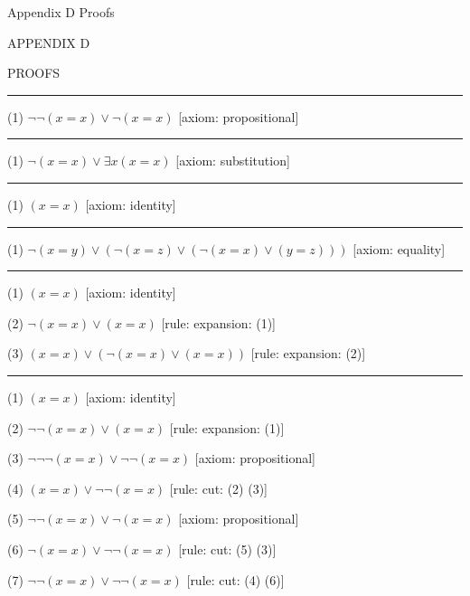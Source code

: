  {Appendix D Proofs}
\centerline{\xmplbxi APPENDIX D}
\medskip
\centerline{\xmplbx PROOFS}
\bigskip

\medskip
\hrule
\medskip
\item{(1)} $\neg \neg (x = x) \lor \neg (x = x)$ \hfill [axiom: propositional]
\medskip
\hrule
\medskip
\item{(1)} $\neg (x = x) \lor \exists x (x = x)$ \hfill [axiom: substitution]
\medskip
\hrule
\medskip
\item{(1)} $(x = x)$ \hfill [axiom: identity]
\medskip
\hrule
\medskip
\item{(1)} $\neg (x = y) \lor (\neg (x = z) \lor (\neg (x = x) \lor (y = z)))$ \hfill [axiom: equality]
\medskip
\hrule
\medskip
\item{(1)} $(x = x)$ \hfill [axiom: identity]
\item{(2)} $\neg (x = x) \lor (x = x)$ \hfill [rule: expansion: (1)]
\item{(3)} $(x = x) \lor (\neg (x = x) \lor (x = x))$ \hfill [rule: expansion: (2)]
\medskip
\hrule
\medskip
\item{(1)} $(x = x)$ \hfill [axiom: identity]
\item{(2)} $\neg \neg (x = x) \lor (x = x)$ \hfill [rule: expansion: (1)]
\item{(3)} $\neg \neg \neg (x = x) \lor \neg \neg (x = x)$ \hfill [axiom: propositional]
\item{(4)} $(x = x) \lor \neg \neg (x = x)$ \hfill [rule: cut: (2) (3)]
\item{(5)} $\neg \neg (x = x) \lor \neg (x = x)$ \hfill [axiom: propositional]
\item{(6)} $\neg (x = x) \lor \neg \neg (x = x)$ \hfill [rule: cut: (5) (3)]
\item{(7)} $\neg \neg (x = x) \lor \neg \neg (x = x)$ \hfill [rule: cut: (4) (6)]
